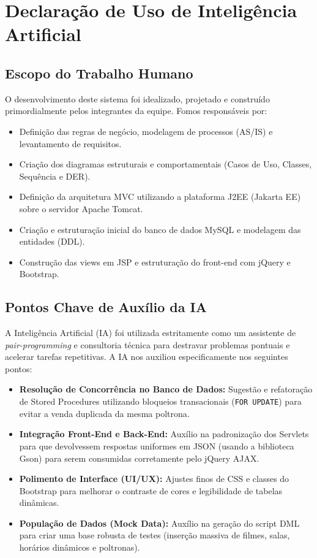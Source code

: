 \section{Declaração de Uso de Inteligência Artificial}

\subsection{Escopo do Trabalho Humano}
O desenvolvimento deste sistema foi idealizado, projetado e construído primordialmente pelos integrantes da equipe. Fomos responsáveis por:
\begin{itemize}
    \item Definição das regras de negócio, modelagem de processos (AS/IS) e levantamento de requisitos.
    \item Criação dos diagramas estruturais e comportamentais (Casos de Uso, Classes, Sequência e DER).
    \item Definição da arquitetura MVC utilizando a plataforma J2EE (Jakarta EE) sobre o servidor Apache Tomcat.
    \item Criação e estruturação inicial do banco de dados MySQL e modelagem das entidades (DDL).
    \item Construção das views em JSP e estruturação do front-end com jQuery e Bootstrap.
\end{itemize}

\subsection{Pontos Chave de Auxílio da IA}
A Inteligência Artificial (IA) foi utilizada estritamente como um assistente de \textit{pair-programming} e consultoria técnica para destravar problemas pontuais e acelerar tarefas repetitivas. A IA nos auxiliou especificamente nos seguintes pontos:
\begin{itemize}
    \item \textbf{Resolução de Concorrência no Banco de Dados:} Sugestão e refatoração de Stored Procedures utilizando bloqueios transacionais (\texttt{FOR UPDATE}) para evitar a venda duplicada da mesma poltrona.
    \item \textbf{Integração Front-End e Back-End:} Auxílio na padronização dos Servlets para que devolvessem respostas uniformes em JSON (usando a biblioteca Gson) para serem consumidas corretamente pelo jQuery AJAX.
    \item \textbf{Polimento de Interface (UI/UX):} Ajustes finos de CSS e classes do Bootstrap para melhorar o contraste de cores e legibilidade de tabelas dinâmicas.
    \item \textbf{População de Dados (Mock Data):} Auxílio na geração do script DML para criar uma base robusta de testes (inserção massiva de filmes, salas, horários dinâmicos e poltronas).
\end{itemize}

